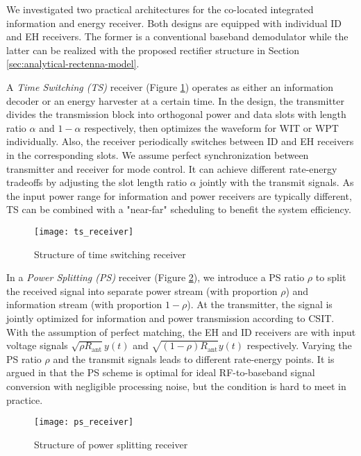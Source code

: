 We investigated two practical architectures for the co-located integrated information and energy receiver. Both designs are equipped with individual ID and EH receivers. The former is a conventional baseband demodulator while the latter can be realized with the proposed rectifier structure in Section \ref{sec:analytical-rectenna-model}.

A \textit{Time Switching (TS)} receiver (Figure \ref{fig:ts-receiver}) operates as either an information decoder or an energy harvester at a certain time. In the design, the transmitter divides the transmission block into orthogonal power and data slots with length ratio $\alpha $ and $1 - \alpha $ respectively, then optimizes the waveform for WIT or WPT individually. Also, the receiver periodically switches between ID and EH receivers in the corresponding slots. We assume perfect synchronization between transmitter and receiver for mode control. It can achieve different rate-energy tradeoffs by adjusting the slot length ratio $\alpha $ jointly with the transmit signals. As the input power range for information and power receivers are typically different, TS can be combined with a "near-far" scheduling \cite{Zhang2013} to benefit the system efficiency.

\begin{figure}
  \centering
    \texttt{[image: ts\_receiver]}
  \caption{Structure of time switching receiver \cite{Clerckx2019}}
  \label{fig:ts-receiver}
\end{figure}

In a \textit{Power Splitting (PS)} receiver (Figure \ref{fig:ps-receiver}), we introduce a PS ratio $\rho $ to split the received signal into separate power stream (with proportion $\rho $) and information stream (with proportion $1 - \rho $). At the transmitter, the signal is jointly optimized for information and power transmission according to CSIT. With the assumption of perfect matching, the EH and ID receivers are with input voltage signals $\sqrt {\rho {R_{{\text{ant}}}}} y(t)$ and $\sqrt {(1 - \rho ){R_{{\text{ant}}}}} y(t)$ respectively. Varying the PS ratio $\rho $ and the transmit signals leads to different rate-energy points. It is argued in \cite{Zhang2013} that the PS scheme is optimal for ideal RF-to-baseband signal conversion with negligible processing noise, but the condition is hard to meet in practice.

\begin{figure}
  \centering
    \texttt{[image: ps\_receiver]}
  \caption{Structure of power splitting receiver \cite{Clerckx2019}}
  \label{fig:ps-receiver}
\end{figure}